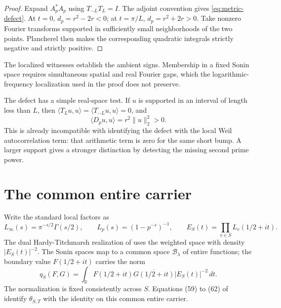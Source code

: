 \documentclass[11pt,letterpaper]{article}
\theoremstyle{definition}
\theoremstyle{remark}
\newcommand{\R}{\mathbb R}
\newcommand{\Bcal}{\mathcal B}
\begin{document}
\begin{proof}
Expand $A_p^*A_p$ using $T_{-L}T_L=I$. The adjoint convention gives
\eqref{eq:metric-defect}. At $t=0$, $d_p=r^2-2r<0$; at
$t=\pi/L$, $d_p=r^2+2r>0$. Take nonzero Fourier transforms supported
in sufficiently small neighborhoods of the two points. Plancherel
then makes the corresponding quadratic integrals strictly negative
and strictly positive.
\end{proof}

The localized witnesses establish the ambient signs. Membership in a
fixed Sonin space requires simultaneous spatial and real Fourier
gaps, which the logarithmic-frequency localization used in the
proof does not preserve.

The defect has a simple real-space test. If $u$ is supported in an
interval of length less than $L$, then
$\langle T_Lu,u\rangle=\langle T_{-L}u,u\rangle=0$, and
\begin{equation}\label{eq:short-bump-defect}
 \langle D_pu,u\rangle=r^2\|u\|_2^2>0.
\end{equation}
This is already incompatible with identifying the defect with the
local Weil autocorrelation term: that arithmetic term is zero for
the same short bump. A larger support gives a stronger distinction
by detecting the missing second prime power.

\section{The common entire carrier}

Write the standard local factors as
\begin{equation}\label{eq:Euler-factors}
 L_\infty(s)=\pi^{-s/2}\Gamma(s/2),\qquad
 L_p(s)=(1-p^{-s})^{-1},\qquad
 E_S(t)=\prod_{v\in S}L_v(1/2+it).
\end{equation}
The dual Hardy-Titchmarsh realization of \cite[Section 4.4]{CCM}
uses the weighted space with density $|E_S(t)|^{-2}$. The Sonin
spaces map to a common space $\Bcal_\lambda$ of entire functions;
the boundary value $F(1/2+it)$ carries the norm
\begin{equation}\label{eq:carrier-norm}
 q_S(F,G)=\int_\R F(1/2+it)\overline{G(1/2+it)}
               |E_S(t)|^{-2}\,dt.
\end{equation}
The normalization is fixed consistently across $S$. Equations (59)
to (62) of \cite{CCM} identify $\theta_{S,T}$ with the identity on
this common entire carrier.
\end{document}
